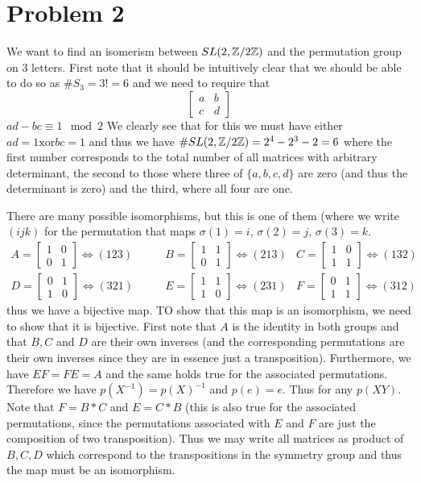 \section*{Problem 2}
We want to find an isomerism between $SL(2,\mathbb{Z} /2 \mathbb{Z})$ and the permutation group on $3$ letters. First note that it should be intuitively clear that we should be able to do so as $\#S_3=3!=6$ and we need to require that
\[ \begin{bmatrix}
a &b \\ c&  d
\end{bmatrix} \]
$ad - bc \equiv 1 \mod{2}$
We clearly see that for this we must have either $ad=1 \text{xor} bc=1$ and thus we have $\#SL(2,\mathbb{Z} /2 \mathbb{Z})=2^4-2^3-2 =6$ where the first number corresponds to the total number of all matrices with arbitrary determinant, the second to those where three of $\{a,b,c,d\}$ are zero (and thus the determinant is zero) and the third, where all four are one. \par
There are many possible isomorphisms, but this is one of them (where we write $(ijk)$ for the permutation that maps $\sigma(1)=i$, $\sigma(2)=j$, $\sigma(3)=k$. 
\begin{align*}
 A=\begin{bmatrix}
1 & 0\\ 0 &  1 
\end{bmatrix} \Leftrightarrow (123)  \qquad &
B=\begin{bmatrix}
1 & 1\\ 0 &  1
\end{bmatrix}  \Leftrightarrow (213) &
C=\begin{bmatrix}
1 & 0\\ 1 &  1 
\end{bmatrix} \Leftrightarrow (132) &\\
D=\begin{bmatrix} 
0 & 1\\ 1 &  0
\end{bmatrix} \Leftrightarrow (321)  \qquad &
E=\begin{bmatrix}
1 & 1\\ 1 &  0 
\end{bmatrix} \Leftrightarrow (231) &
F=\begin{bmatrix}
0 & 1\\ 1 &  1
\end{bmatrix}  \Leftrightarrow (312)  &
\end{align*}
thus we have a bijective map. TO show that this map is an isomorphism, we need to show that it is bijective.
First note that $A$ is the identity in both groups and that $B,C$ and $D$ are their own inverses (and the corresponding permutations are their own inverses since they are in essence just a transposition). Furthermore, we have $EF=FE=A$ and the same holds true for the associated permutations. Therefore we have $p(X^{-1}) = p(X)^{-1}$ and $p(e) = e$. Thus for any $p(XY)$. Note that $F=B*C$ and $E=C*B$ (this is also true for the associated permutations, since the permutations associated with $E$ and $F$ are just the composition of two transposition). Thus we may write all matrices as product of $B,C,D$ which correspond to the transpositions in the symmetry group and thus the map must be an isomorphism.
